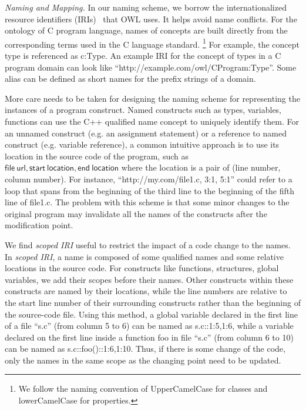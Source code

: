 {\em Naming and Mapping.} 
In our naming scheme, we borrow the internationalized resource
identifiers (IRIs)~\cite{hitzler2009owl} that OWL uses. It helps avoid name conflicts. 
For the ontology of C program language, names of concepts are built directly from the corresponding terms used in the C language standard.
\footnote{We follow the naming convention of \textsf{UpperCamelCase}
  for classes and \textsf{lowerCamelCase} for properties.}  For
example, the concept \textsf{type} is referenced as \textsf{c:Type}.
An example IRI for the concept of types in a C program domain can look
like ``http://example.com/owl/CProgram:Type''.  Some alias can be
defined as short names for the prefix strings of a domain.

More care needs to be taken for designing the naming scheme for
representing the instances of a program construct.  Named constructs
such as types, variables, functions can use the C++ qualified name
concept to uniquely identify them.  For an unnamed construct (e.g. an
assignment statement) or a reference to named construct (e.g. variable
reference), a common intuitive approach is to use its location in the
source code of the program, such as $ \mathsf{file\ url,
  start\ location,end\ location} $ where the location is a pair of
(\textsf{line number}, \textsf{column number}). For instance,
``http://my.com/file1.c, 3:1, 5:1'' could refer to a loop that spans
from the beginning of the third line to the beginning of the fifth
line of file1.c. The problem with this scheme is that some minor
changes to the original program may invalidate all the names of the
constructs after the modification point.

We find {\em scoped IRI} useful to restrict the impact of a code
change to the names.  In {\em scoped IRI}, a name is composed of some
qualified names and some relative locations in the source code. For
constructs like functions, structures, global variables, we add their
scopes before their names. Other constructs within these constructs
are named by their locations, while the line numbers are relative to
the start line number of their surrounding constructs rather than the
beginning of the source-code file. Using this method, a global
variable declared in the first line of a file ``s.c'' (from column 5
to 6) can be named as \textsf{s.c::1:5,1:6}, while a variable declared
on the first line inside a function foo in file ``s.c'' (from column 6
to 10) can be named as \textsf{s.c::foo()::1:6,1:10}.  Thus, if there
is some change of the code, only the names in the same scope as the
changing point need to be updated.

